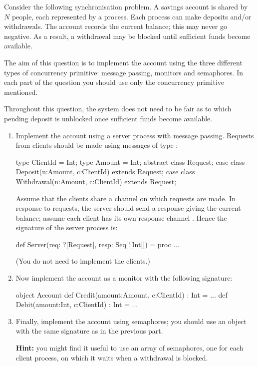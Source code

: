 \begin{question}
Consider the following synchronisation problem.  A savings account is shared
by $N$ people, each represented by a process.  Each process can make
deposits and/or withdrawals.  The account records the current balance; this
may never go negative.  As a result, a withdrawal may be blocked until
sufficient funds become available.  

The aim of this question is to implement the account using the three different
types of concurrency primitive: message passing, monitors and semaphores.  In
each part of the question you should use only the concurrency primitive
mentioned. 

Throughout this question, the system does not need to be fair as to which
pending deposit is unblocked once sufficient funds become available.


\begin{enumerate}
\item
Implement the account using a server process with message passing.  Requests
from clients should be made using messages of type :
\begin{scala}
  type ClientId = Int;
  type Amount = Int;
  abstract class Request;
  case class Deposit(n:Amount, c:ClientId) 
         extends Request;
  case class Withdrawal(n:Amount, c:ClientId) 
         extends Request;
\end{scala}
%
Assume that the clients share a channel  on which requests are
made.  In response to requests, the server should send a response giving the
current balance; assume each client  has its own response channel
.  Hence the signature of the server process is:
%
\begin{scala}
  def Server(req: ?[Request], resp: Seq[![Int]]) 
  = proc{ ... }
\end{scala}
%
(You do not need to implement the clients.)


\item
Now implement the account as a monitor with the following signature:
%
\begin{scala}
object Account{
  def Credit(amount:Amount, c:ClientId) : Int = ...
  def Debit(amount:Int, c:ClientId) : Int = ...
}
\end{scala}


\item
Finally, implement the account using semaphores; you should use an object with
the same signature as in the previous part.

{\bf Hint:} you might find it useful to use an array of semaphores, one for
each client process, on which it waits when a withdrawal is blocked.
\end{enumerate}
\end{question}

